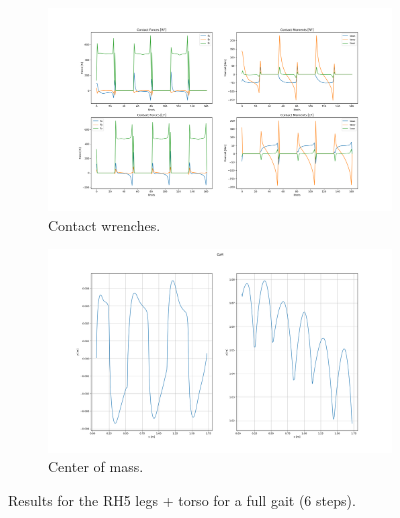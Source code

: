 \begin{figure}[h!]\ContinuedFloat
\begin{subfigure}{1\textwidth}
  	\centering
	\includegraphics[width=.9\linewidth]{Media/Crocoddyl/RH5Torso/RH5TorsoGait_ContactWrenches.png}
	\caption{Contact wrenches.}
\end{subfigure}
\begin{subfigure}{1\textwidth}
  	\centering
	\includegraphics[width=.9\linewidth]{Media/Crocoddyl/RH5Torso/RH5TorsoGait_CoM2.png}
	\caption{Center of mass.}
\end{subfigure}
\caption{Results for the RH5 legs + torso for a full gait (6 steps).}
\label{fig:rh5Torso_full_gait}
\centering
\end{figure}



